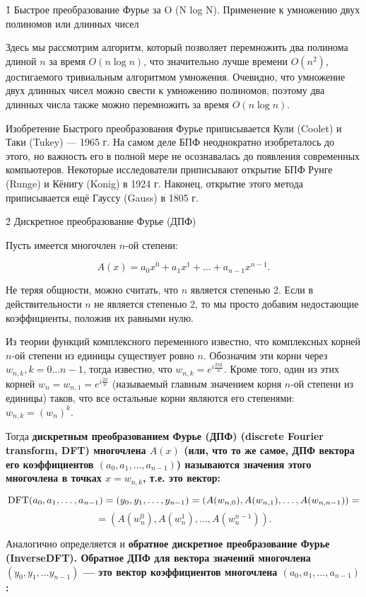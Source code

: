\h1{ Быстрое преобразование Фурье за O (N log N). Применение к умножению двух полиномов или длинных чисел }

Здесь мы рассмотрим алгоритм, который позволяет перемножить два полинома длиной $n$ за время $O(n \log n)$, что значительно лучше времени $O(n^2)$, достигаемого тривиальным алгоритмом умножения. Очевидно, что умножение двух длинных чисел можно свести к умножению полиномов, поэтому два длинных числа также можно перемножить за время $O(n \log n)$.

Изобретение Быстрого преобразования Фурье приписывается Кули (Coolet) и Таки (Tukey) --- 1965 г. На самом деле БПФ неоднократно изобреталось до этого, но важность его в полной мере не осознавалась до появления современных компьютеров. Некоторые исследователи приписывают открытие БПФ Рунге (Runge) и Кёнигу (Konig) в 1924 г. Наконец, открытие этого метода приписывается ещё Гауссу (Gauss) в 1805 г.


\h2{ Дискретное преобразование Фурье (ДПФ) }

Пусть имеется многочлен $n$-ой степени:

$$ A(x) = a_0 x^0 + a_1 x^1 + \ldots + a_{n-1} x^{n-1}. $$

Не теряя общности, можно считать, что $n$ является степенью 2. Если в действительности $n$ не является степенью 2, то мы просто добавим недостающие коэффициенты, положив их равными нулю.

Из теории функций комплексного переменного известно, что комплексных корней $n$-ой степени из единицы существует ровно $n$. Обозначим эти корни через $w_{n,k}, k = 0 \ldots {n-1}$, тогда известно, что $w_{n,k} = e^{ i \frac{ 2 \pi k }{ n } }$. Кроме того, один из этих корней $w_n = w_{n,1} = e^{ i \frac{ 2 \pi }{ n } }$ (называемый главным значением корня $n$-ой степени из единицы) таков, что все остальные корни являются его степенями: $w_{n,k} = (w_n)^k$.

Тогда \bf{дискретным преобразованием Фурье (ДПФ)} (discrete Fourier transform, DFT) многочлена $A(x)$ (или, что то же самое, ДПФ вектора его коэффициентов $(a_0, a_1, \dots, a_{n-1})$) называются значения этого многочлена в точках $x = w_{n,k}$, т.е. это вектор:

$$ {\rm DFT}(a_0, a_1, \ldots, a_{n-1}) = (y_0, y_1, \ldots, y_{n-1}) = (A(w_{n,0}), A(w_{n,1}), \ldots, A(w_{n,n-1})) = $$
$$ = (A(w_n^0), A(w_n^1), \ldots, A(w_n^{n-1})). $$

Аналогично определяется и \bf{обратное дискретное преобразование Фурье} (InverseDFT). Обратное ДПФ для вектора значений многочлена $(y_0, y_1, \ldots y_{n-1})$ --- это вектор коэффициентов многочлена $(a_0, a_1, \ldots, a_{n-1})$:


